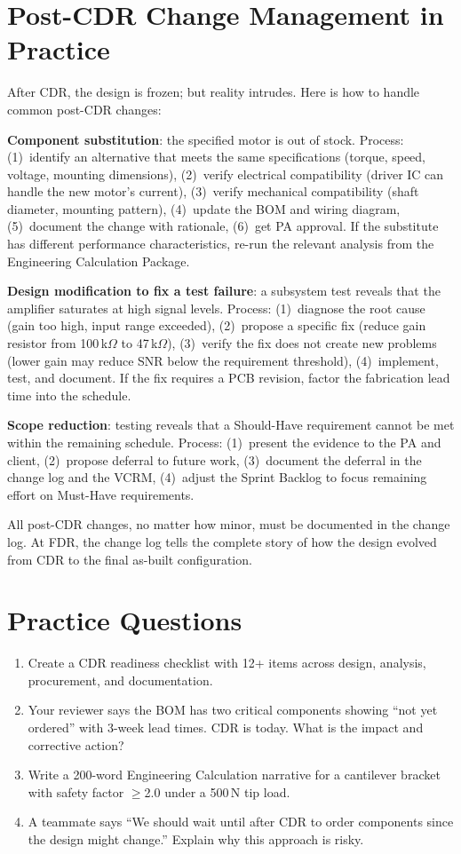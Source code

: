 \section{Post-CDR Change Management in Practice}
After CDR, the design is frozen; but reality intrudes. Here is how to handle common post-CDR changes:

\textbf{Component substitution}: the specified motor is out of stock. Process: (1)~identify an alternative that meets the same specifications (torque, speed, voltage, mounting dimensions), (2)~verify electrical compatibility (driver IC can handle the new motor's current), (3)~verify mechanical compatibility (shaft diameter, mounting pattern), (4)~update the BOM and wiring diagram, (5)~document the change with rationale, (6)~get PA approval. If the substitute has different performance characteristics, re-run the relevant analysis from the Engineering Calculation Package.

\textbf{Design modification to fix a test failure}: a subsystem test reveals that the amplifier saturates at high signal levels. Process: (1)~diagnose the root cause (gain too high, input range exceeded), (2)~propose a specific fix (reduce gain resistor from 100\,k$\Omega$ to 47\,k$\Omega$), (3)~verify the fix does not create new problems (lower gain may reduce SNR below the requirement threshold), (4)~implement, test, and document. If the fix requires a PCB revision, factor the fabrication lead time into the schedule.

\textbf{Scope reduction}: testing reveals that a Should-Have requirement cannot be met within the remaining schedule. Process: (1)~present the evidence to the PA and client, (2)~propose deferral to future work, (3)~document the deferral in the change log and the VCRM, (4)~adjust the Sprint Backlog to focus remaining effort on Must-Have requirements.

All post-CDR changes, no matter how minor, must be documented in the change log. At FDR, the change log tells the complete story of how the design evolved from CDR to the final as-built configuration.


\section{Practice Questions}
\begin{enumerate}[leftmargin=1.5em]
\item Create a CDR readiness checklist with 12+ items across design, analysis, procurement, and documentation.
\item Your reviewer says the BOM has two critical components showing ``not yet ordered'' with 3-week lead times. CDR is today. What is the impact and corrective action?
\item Write a 200-word Engineering Calculation narrative for a cantilever bracket with safety factor $\geq$2.0 under a 500\,N tip load.
\item A teammate says ``We should wait until after CDR to order components since the design might change.'' Explain why this approach is risky.
\end{enumerate}


